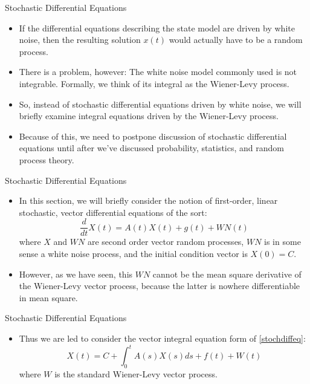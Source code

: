 \begin{frame}
Stochastic Differential Equations
 \begin{itemize}
  \item If the differential equations describing the state model are driven by white noise, then the resulting solution $x(t)$ would actually have to be a random process.
  \item There is a problem, however:  The white noise model commonly used is not integrable.  Formally, we think of its integral as the Wiener-Levy process.
  \item So, instead of stochastic differential equations driven by white noise, we will briefly examine integral equations driven by the Wiener-Levy process.
  \item Because of this, we need to postpone discussion of stochastic differential equations until after we've discussed probability, statistics, and random process theory.
\end{itemize}
\end{frame}
\begin{frame}
Stochastic Differential Equations
 \begin{itemize}
 \item In this section, we will briefly consider the notion of
 first-order, linear stochastic, vector differential equations of the
 sort:
\begin{equation}\label{stochdiffeq}
  \frac{d}{dt}X(t) = A(t)X(t) + g(t) + WN(t)
\end{equation}
where $X$ and $WN$ are second order vector random processes, $WN$
is in some sense a white noise process, and the initial condition
vector is $X(0)=C$.
 \item However, as we have seen, this $WN$ cannot be the
mean square derivative of the Wiener-Levy vector process, because
the latter is nowhere differentiable in mean square.
\end{itemize}
\end{frame}
\begin{frame}
Stochastic Differential Equations
 \begin{itemize}
 \item Thus we are led to consider the vector integral equation form of
 \eqref{stochdiffeq}:
\begin{equation}\label{inteq}
X(t)=C+\int_0^tA(s)X(s)ds+f(t)+W(t)
\end{equation}
where $W$ is the standard Wiener-Levy vector process.
\end{itemize}
\end{frame}
